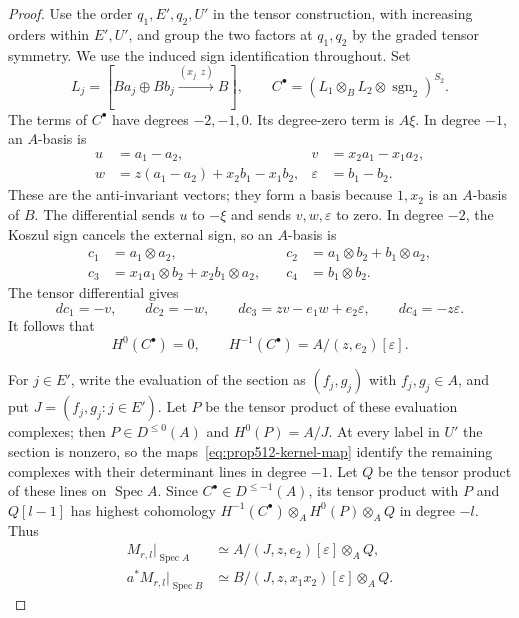 \documentclass[11pt,letterpaper]{amsart}
\theoremstyle{plain}
\theoremstyle{definition}
\theoremstyle{remark}
\numberwithin{equation}{section}
\begin{document}
\begin{proof}
Use the order $q_1,E',q_2,U'$ in the tensor construction, with
increasing orders within $E',U'$, and group the two factors at
$q_1,q_2$ by the graded tensor symmetry. We use the induced sign
identification throughout. Set
\[
 L_j=[Ba_j\oplus Bb_j\xrightarrow{(x_j\ \ z)}B],\qquad
 C^\bullet=(L_1\otimes_B L_2\otimes\operatorname{sgn}_2)^{S_2}.
\]
The terms of $C^\bullet$ have degrees $-2,-1,0$.
 Its degree-zero term is $A\xi$. In degree $-1$, an $A$-basis is
\[
 \begin{aligned}
 u&=a_1-a_2,& v&=x_2a_1-x_1a_2,\\
 w&=z(a_1-a_2)+x_2b_1-x_1b_2,&
 \varepsilon&=b_1-b_2.
 \end{aligned}
\]
These are the anti-invariant vectors; they form a basis because
$1,x_2$ is an $A$-basis of $B$. The differential sends
$u$ to $-\xi$ and sends $v,w,\varepsilon$ to zero.
In degree $-2$, the Koszul sign cancels the external sign, so an
$A$-basis is
\[
 \begin{aligned}
 c_1&=a_1\otimes a_2,\quad
 &c_2&=a_1\otimes b_2+b_1\otimes a_2,\\
 c_3&=x_1a_1\otimes b_2+x_2b_1\otimes a_2,\quad
 &c_4&=b_1\otimes b_2.
 \end{aligned}
\]
The tensor differential gives
\[
 dc_1=-v,\qquad dc_2=-w,\qquad
 dc_3=zv-e_1w+e_2\varepsilon,\qquad dc_4=-z\varepsilon.
\]
It follows that
\begin{equation}\label{eq:mixed-descended}
 H^0(C^\bullet)=0,\qquad
 H^{-1}(C^\bullet)=A/(z,e_2)[\varepsilon].
\end{equation}

For $j\in E'$, write the evaluation of the section as $(f_j,g_j)$ with
$f_j,g_j\in A$, and put $J=(f_j,g_j:j\in E')$.
Let $P$ be the tensor product of these evaluation complexes;
then $P\in D^{\le0}(A)$ and $H^0(P)=A/J$.
At every label in $U'$ the section is nonzero, so the
maps~\eqref{eq:prop512-kernel-map} identify the remaining complexes
with their determinant lines in degree $-1$.
Let $Q$ be the tensor product of these lines on
$\operatorname{Spec}A$.
Since $C^\bullet\in D^{\le-1}(A)$, its tensor product with
$P$ and $Q[l-1]$ has highest cohomology
$H^{-1}(C^\bullet)\otimes_A H^0(P)\otimes_A Q$ in degree $-l$.
Thus
\begin{equation}\label{eq:prop512-full-local-modules}
 \begin{aligned}
 M_{r,l}|_{\operatorname{Spec}A}
   &\simeq A/(J,z,e_2)[\varepsilon]\otimes_A Q,\\
 a^*M_{r,l}|_{\operatorname{Spec}B}
   &\simeq B/(J,z,x_1x_2)[\varepsilon]\otimes_A Q.
 \end{aligned}
\end{equation}


\end{proof}
\end{document}
